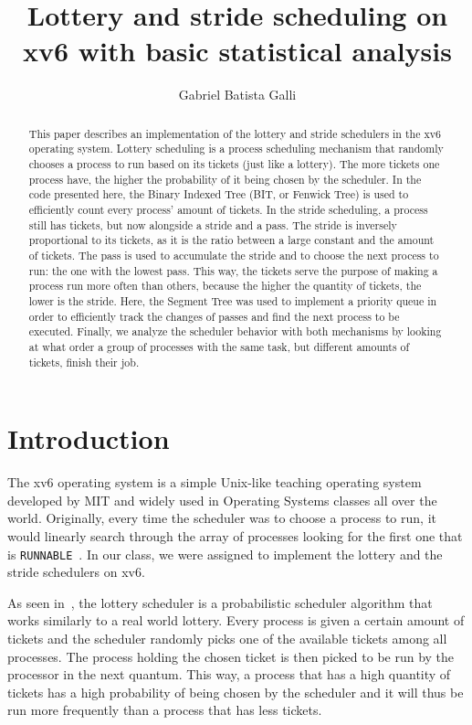 \documentclass[12pt]{article}
\title{Lottery and stride scheduling on xv6 with basic statistical analysis}
\author{Gabriel Batista Galli\inst{1}}
\begin{document}
\maketitle

\begin{abstract}
This paper describes an implementation of the lottery and stride schedulers in the xv6 operating system. Lottery scheduling is a process scheduling mechanism that randomly chooses a process to run based on its tickets (just like a lottery). The more tickets one process have, the higher the probability of it being chosen by the scheduler. In the code presented here, the Binary Indexed Tree (BIT, or Fenwick Tree) is used to efficiently count every process' amount of tickets. In the stride scheduling, a process still has tickets, but now alongside a stride and a pass. The stride is inversely proportional to its tickets, as it is the ratio between a large constant and the amount of tickets. The pass is used to accumulate the stride and to choose the next process to run: the one with the lowest pass. This way, the tickets serve the purpose of making a process run more often than others, because the higher the quantity of tickets, the lower is the stride. Here, the Segment Tree was used to implement a priority queue in order to efficiently track the changes of passes and find the next process to be executed. Finally, we analyze the scheduler behavior with both mechanisms by looking at what order a group of processes with the same task, but different amounts of tickets, finish their job.
\end{abstract}

\section{Introduction}
The xv6 operating system is a simple Unix-like teaching operating system developed by MIT and widely used in Operating Systems classes all over the world. Originally, every time the scheduler was to choose a process to run, it would linearly search through the array of processes looking for the first one that is \texttt{RUNNABLE}~\cite{xv6book}. In our class, we were assigned to implement the lottery and the stride schedulers on xv6.

As seen in~\cite{waldspurger:94}, the lottery scheduler is a probabilistic scheduler algorithm that works similarly to a real world lottery. Every process is given a certain amount of tickets and the scheduler randomly picks one of the available tickets among all processes. The process holding the chosen ticket is then picked to be run by the processor in the next quantum. This way, a process that has a high quantity of tickets has a high probability of being chosen by the scheduler and it will thus be run more frequently than a process that has less tickets.
\end{document}
